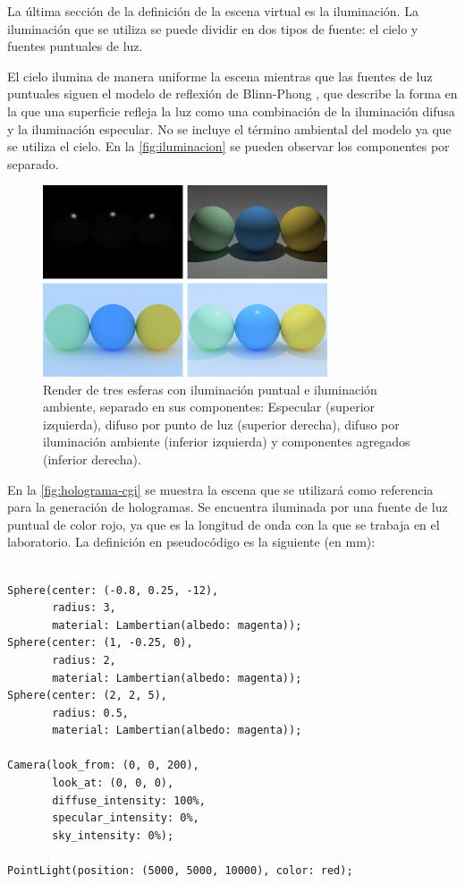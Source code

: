 \documentclass[10pt, a4paper]{article}
\begin{document}
La última sección de la definición de la escena virtual es la iluminación. La iluminación que se utiliza se puede dividir en dos tipos de fuente: el cielo y fuentes puntuales de luz.

El cielo ilumina de manera uniforme la escena mientras que las fuentes de luz puntuales siguen el modelo de reflexión de Blinn-Phong \cite{Blinn:1977}, que describe la forma en la que una superficie refleja la luz como una combinación de la iluminación difusa y la iluminación especular. No se incluye el término ambiental del modelo ya que se utiliza el cielo. En la \autoref{fig:iluminacion} se pueden observar los componentes por separado.

\begin{figure}[H]
    \centering 
    \includegraphics[width=0.75\textwidth]{05_agg}
    \caption{Render de tres esferas con iluminación puntual e iluminación ambiente, separado en sus componentes: Especular (superior izquierda), difuso por punto de luz (superior derecha), difuso por iluminación ambiente (inferior izquierda) y componentes agregados (inferior derecha).}
    \label{fig:iluminacion}
\end{figure}

En la \autoref{fig:holograma-cgi} se muestra la escena que se utilizará como referencia para la generación de hologramas. Se encuentra iluminada por una fuente de luz puntual de color rojo, ya que es la longitud de onda con la que se trabaja en el laboratorio. La definición en pseudocódigo es la siguiente (en mm):

\begin{verbatim}

Sphere(center: (-0.8, 0.25, -12), 
       radius: 3,
       material: Lambertian(albedo: magenta));
Sphere(center: (1, -0.25, 0),
       radius: 2,
       material: Lambertian(albedo: magenta));
Sphere(center: (2, 2, 5), 
       radius: 0.5,
       material: Lambertian(albedo: magenta));

Camera(look_from: (0, 0, 200),
       look_at: (0, 0, 0),
       diffuse_intensity: 100%,
       specular_intensity: 0%,
       sky_intensity: 0%);

PointLight(position: (5000, 5000, 10000), color: red);

\end{verbatim}
\end{document}
